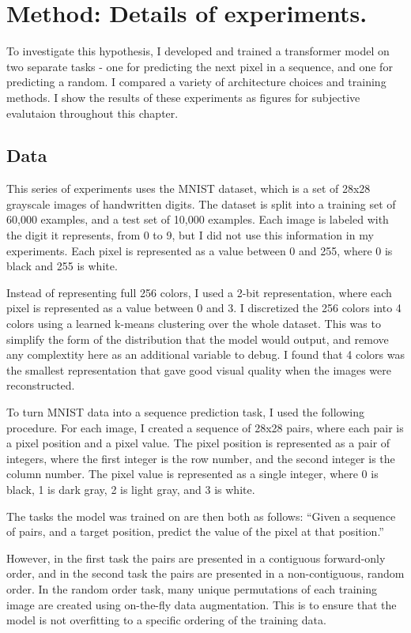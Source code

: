\section{Method: Details of experiments.}

To investigate this hypothesis, I developed and trained a transformer model on two separate tasks - one for predicting the next pixel in a sequence, and one for predicting a random. I compared a variety of architecture choices and training methods. I show the results of these experiments as figures for subjective evalutaion throughout this chapter.

\subsection{Data}

This series of experiments uses the MNIST dataset, which is a set of 28x28 grayscale images of handwritten digits. The dataset is split into a training set of 60,000 examples, and a test set of 10,000 examples. Each image is labeled with the digit it represents, from 0 to 9, but I did not use this information in my experiments. Each pixel is represented as a value between 0 and 255, where 0 is black and 255 is white.

Instead of representing full 256 colors, I used a 2-bit representation, where each pixel is represented as a value between 0 and 3. I discretized the 256 colors into 4 colors using a learned k-means clustering over the whole dataset. This was to simplify the form of the distribution that the model would output, and remove any complextity here as an additional variable to debug. I found that 4 colors was the smallest representation that gave good visual quality when the images were reconstructed.

To turn MNIST data into a sequence prediction task, I used the following procedure. For each image, I created a sequence of 28x28 pairs, where each pair is a pixel position and a pixel value. The pixel position is represented as a pair of integers, where the first integer is the row number, and the second integer is the column number. The pixel value is represented as a single integer, where 0 is black, 1 is dark gray, 2 is light gray, and 3 is white.


The tasks the model was trained on are then both as follows: ``Given a sequence of pairs, and a target position, predict the value of the pixel at that position.''

However, in the first task the pairs are presented in a contiguous forward-only order, and in the second task the pairs are presented in a non-contiguous, random order. In the random order task, many unique permutations of each training image are created using on-the-fly data augmentation. This is to ensure that the model is not overfitting to a specific ordering of the training data.


